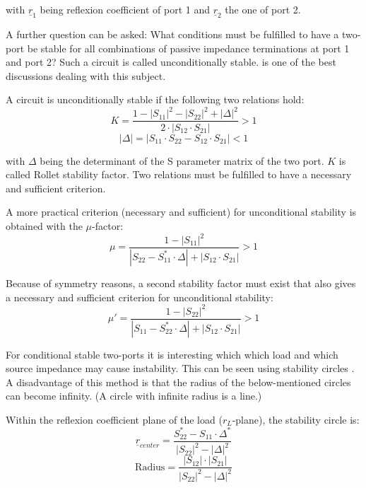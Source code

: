 with $\underline{r}_1$ being reflexion coefficient of port 1 and
$\underline{r}_2$ the one of port 2.

\addvspace{12pt}

A further question can be asked: What conditions must be fulfilled to have a
two-port be stable for all combinations of passive impedance terminations at
port 1 and port 2?  Such a circuit is called unconditionally stable.
\cite{Edwards3} is one of the best discussions dealing with this subject.

\addvspace{12pt}

A circuit is unconditionally stable if the following two relations
hold:
\begin{equation}
K = \frac{1-|S_{11}|^2-|S_{22}|^2+|\Delta|^2}{2\cdot |S_{12}\cdot S_{21}|} > 1
\end{equation}
\begin{equation}
|\Delta| = |S_{11}\cdot S_{22} - S_{12}\cdot S_{21}| < 1
\end{equation}

with $\Delta$ being the determinant of the S parameter matrix of the
two port.  $K$ is called Rollet stability factor.  Two relations must
be fulfilled to have a necessary and sufficient criterion.

\addvspace{12pt}

A more practical criterion (necessary and sufficient) for
unconditional stability is obtained with the $\mu$-factor:
\begin{equation}
\mu = \frac{1-|S_{11}|^2}{|S_{22}-S_{11}^*\cdot \Delta| + |S_{12}\cdot S_{21}|} > 1
\end{equation}

Because of symmetry reasons, a second stability factor must exist that
also gives a necessary and sufficient criterion for unconditional
stability:
\begin{equation}
\mu' = \frac{1-|S_{22}|^2}{|S_{11}-S_{22}^*\cdot \Delta| + |S_{12}\cdot S_{21}|} > 1
\end{equation}

\addvspace{12pt}

For conditional stable two-ports it is interesting which which load
and which source impedance may cause instability.  This can be seen
using stability circles \cite{Michel1}.  A disadvantage of this method
is that the radius of the below-mentioned circles can become infinity.
(A circle with infinite radius is a line.)

\addvspace{12pt}

Within the reflexion coefficient plane of the load ($r_L$-plane), the
stability circle is:
\begin{equation}
\underline{r}_{center} = \frac{S_{22}^* - S_{11}\cdot \Delta^*}{|S_{22}|^2 - |\Delta|^2}
\end{equation}
\begin{equation}
\text{Radius} = \frac{|S_{12}|\cdot |S_{21}|}{|S_{22}|^2 - |\Delta|^2}
\end{equation}

